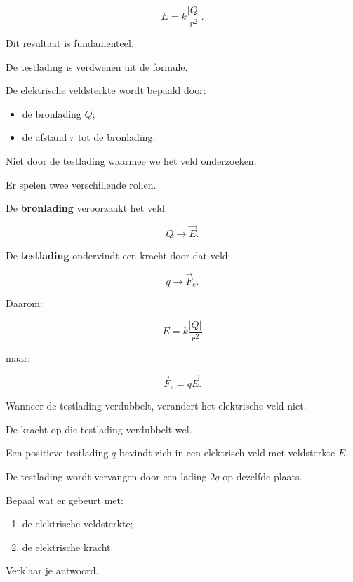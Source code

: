 \documentclass{ximera}
\begin{document}
\[
\boxed{
E
=
k\frac{|Q|}{r^2}.
}
\]


Dit resultaat is fundamenteel.

De testlading is verdwenen uit de formule.

De elektrische veldsterkte wordt bepaald door:

\begin{itemize}
  \item de bronlading $Q$;
  \item de afstand $r$ tot de bronlading.
\end{itemize}

Niet door de testlading waarmee we het veld onderzoeken.




Er spelen twee verschillende rollen.

De \textbf{bronlading} veroorzaakt het veld:

\[
Q
\longrightarrow
\vec E.
\]

De \textbf{testlading} ondervindt een kracht door dat veld:

\[
q
\longrightarrow
\vec F_e.
\]

Daarom:

\[
\boxed{
E=k\frac{|Q|}{r^2}
}
\]

maar:

\[
\boxed{
\vec F_e=q\vec E.
}
\]


\begin{opmerking}

Wanneer de testlading verdubbelt, verandert het elektrische veld niet.

De kracht op die testlading verdubbelt wel.

\end{opmerking}


\begin{oefening}{\oefB\ESS}

Een positieve testlading $q$ bevindt zich in een elektrisch veld met
veldsterkte $E$.

De testlading wordt vervangen door een lading $2q$ op dezelfde plaats.

Bepaal wat er gebeurt met:

\begin{enumerate}
  \item de elektrische veldsterkte;
  \item de elektrische kracht.
\end{enumerate}

Verklaar je antwoord.

\end{oefening}
\end{document}
